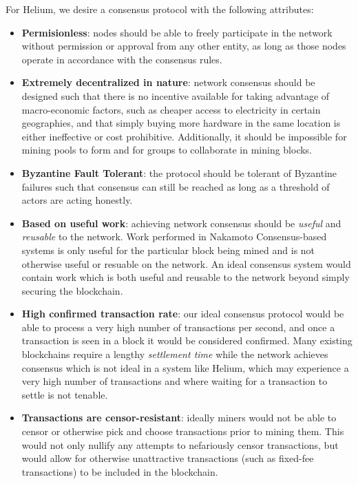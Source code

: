 \documentclass[10pt, nonatbib, nocopyrightspace, reprint]{sigplanconf}
\begin{document}
For Helium, we desire a consensus protocol with the following attributes:

\begin{itemize}
  \item \textbf{Permisionless}: nodes should be able to freely participate in the network without permission or approval from any other entity, as long as those nodes operate in accordance with the consensus rules.
  \item \textbf{Extremely decentralized in nature}: network consensus should be designed such that there is no incentive available for taking advantage of macro-economic factors, such as cheaper access to electricity in certain geographies, and that simply buying more hardware in the same location is either ineffective or cost prohibitive. Additionally, it should be impossible for mining pools to form and for groups to collaborate in mining blocks.
  \item \textbf{Byzantine Fault Tolerant}: the protocol should be tolerant of Byzantine failures \cite{byzantine-failures} such that consensus can still be reached as long as a threshold of actors are acting honestly.
  \item \textbf{Based on useful work}: achieving network consensus should be \emph{useful} and \emph{reusable} to the network. Work performed in Nakamoto Consensus-based systems is only useful for the particular block being mined and is not otherwise useful or resuable on the network. An ideal consensus system would contain work which is both useful and reusable to the network beyond simply securing the blockchain.
  \item \textbf{High confirmed transaction rate}: our ideal consensus protocol would be able to process a very high number of transactions per second, and once a transaction is seen in a block it would be considered confirmed. Many existing blockchains require a lengthy \emph{settlement time} while the network achieves consensus which is not ideal in a system like Helium, which may experience a very high number of transactions and where waiting for a transaction to settle is not tenable.
  \item \textbf{Transactions are censor-resistant}: ideally miners would not be able to censor or otherwise pick and choose transactions prior to mining them. This would not only nullify any attempts to nefariously censor transactions, but would allow for otherwise unattractive transactions (such as fixed-fee transactions) to be included in the blockchain.
\end{itemize}
\end{document}
